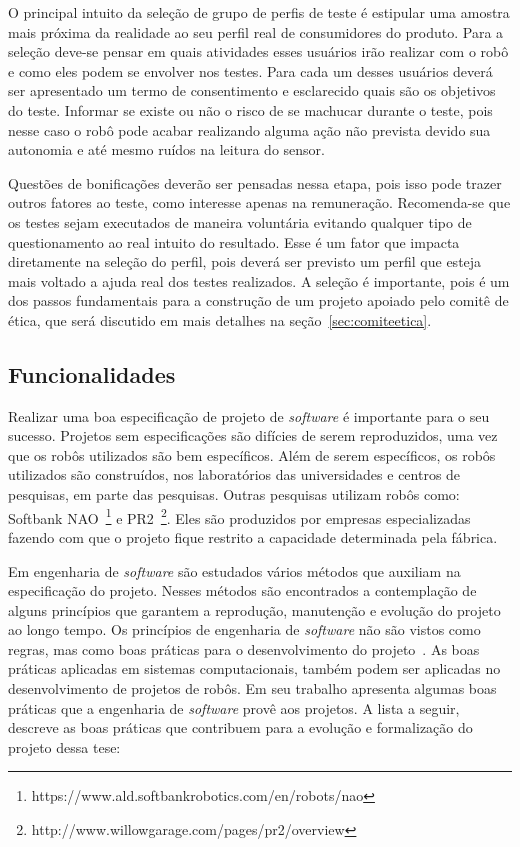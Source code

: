 O principal intuito da seleção de grupo de perfis de teste é estipular uma amostra mais próxima da realidade ao seu perfil real de consumidores do produto. Para a seleção deve-se pensar em quais atividades esses usuários irão realizar com o robô e como eles podem se envolver nos testes. Para cada um desses usuários deverá ser apresentado um termo de consentimento e esclarecido quais são os objetivos do teste. Informar se existe ou não o risco de se machucar durante o teste, pois nesse caso o robô pode acabar realizando alguma ação não prevista devido sua autonomia e até mesmo ruídos na leitura do sensor. 

Questões de bonificações deverão ser pensadas nessa etapa, pois isso pode trazer outros fatores ao teste, como interesse apenas na remuneração. Recomenda-se que os testes sejam executados de maneira voluntária evitando qualquer tipo de questionamento ao real intuito do resultado. Esse é um fator que impacta diretamente na seleção do perfil, pois deverá ser previsto um perfil que esteja mais voltado a ajuda real dos testes realizados. A seleção é importante, pois é um dos passos fundamentais para a construção de um projeto apoiado pelo comitê de ética, que será discutido em mais detalhes na seção~\ref{sec:comiteetica}.

\subsection{Funcionalidades}
\label{sec:funcionalidades}
Realizar uma boa especificação de projeto de \textit{software} é importante para o seu sucesso. Projetos sem especificações são difícies de serem reproduzidos, uma vez que os robôs utilizados são bem específicos. Além de serem específicos, os robôs utilizados são construídos, nos laboratórios das universidades e centros de pesquisas, em parte das pesquisas. Outras pesquisas utilizam robôs como: Softbank NAO~\footnote{https://www.ald.softbankrobotics.com/en/robots/nao} e PR2~\footnote{http://www.willowgarage.com/pages/pr2/overview}. Eles são produzidos por empresas especializadas fazendo com que o projeto fique restrito a capacidade determinada pela fábrica.

Em engenharia de \emph{software} são estudados vários métodos que auxiliam na especificação do projeto. Nesses métodos são encontrados a contemplação de alguns princípios que garantem a reprodução, manutenção e evolução do projeto ao longo tempo. Os princípios de engenharia de \emph{software} não são vistos como regras, mas como boas práticas para o desenvolvimento do projeto~\cite{wazlawick:2013}. As boas práticas aplicadas em sistemas computacionais, também podem ser aplicadas no desenvolvimento de projetos de robôs. Em seu trabalho \textcite{wazlawick:2013} apresenta algumas boas práticas que a engenharia de \emph{software} provê aos projetos. A lista a seguir, descreve as boas práticas que contribuem para a evolução e formalização do projeto dessa tese:

